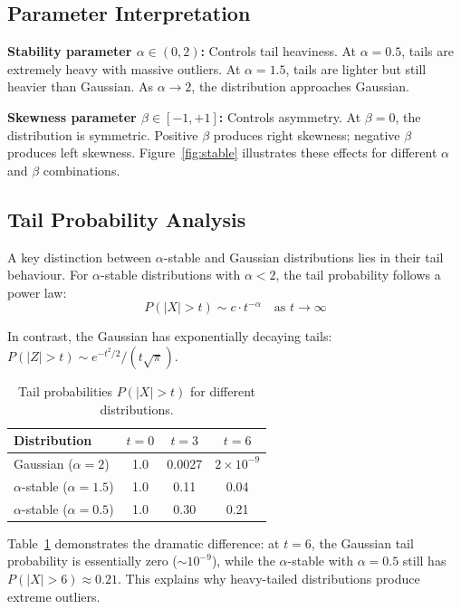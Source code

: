 \documentclass[
	a4paper, %
	10pt, %
	twoside, %
]{LTJournalArticle}
\begin{document}
\subsection{Parameter Interpretation}

\textbf{Stability parameter $\alpha \in (0,2)$:} Controls tail heaviness. At $\alpha = 0.5$, tails are extremely heavy with massive outliers. At $\alpha = 1.5$, tails are lighter but still heavier than Gaussian. As $\alpha \to 2$, the distribution approaches Gaussian.

\textbf{Skewness parameter $\beta \in [-1,+1]$:} Controls asymmetry. At $\beta = 0$, the distribution is symmetric. Positive $\beta$ produces right skewness; negative $\beta$ produces left skewness. Figure~\ref{fig:stable} illustrates these effects for different $\alpha$ and $\beta$ combinations.

\subsection{Tail Probability Analysis}

A key distinction between $\alpha$-stable and Gaussian distributions lies in their tail behaviour. For $\alpha$-stable distributions with $\alpha < 2$, the tail probability follows a power law:
\begin{equation}
	P(|X| > t) \sim c \cdot t^{-\alpha} \quad \text{as } t \to \infty
\end{equation}

In contrast, the Gaussian has exponentially decaying tails: $P(|Z| > t) \sim e^{-t^2/2}/(t\sqrt{\pi})$.

\begin{table}[h]
	\caption{Tail probabilities $P(|X| > t)$ for different distributions.}
	\centering
	\footnotesize
	\begin{tabular}{@{}lccc@{}}
		\toprule
		\textbf{Distribution}            & $t=0$ & $t=3$  & $t=6$              \\
		\midrule
		Gaussian ($\alpha = 2$)          & 1.0   & 0.0027 & $2 \times 10^{-9}$ \\
		$\alpha$-stable ($\alpha = 1.5$) & 1.0   & 0.11   & 0.04               \\
		$\alpha$-stable ($\alpha = 0.5$) & 1.0   & 0.30   & 0.21               \\
		\bottomrule
	\end{tabular}
	\label{tab:tail_probs}
\end{table}

Table~\ref{tab:tail_probs} demonstrates the dramatic difference: at $t = 6$, the Gaussian tail probability is essentially zero ($\sim 10^{-9}$), while the $\alpha$-stable with $\alpha = 0.5$ still has $P(|X| > 6) \approx 0.21$. This explains why heavy-tailed distributions produce extreme outliers.
\end{document}
